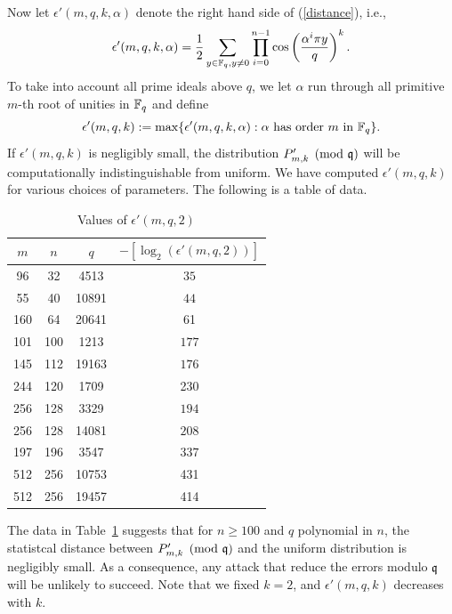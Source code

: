 \documentclass{amsart}
\begin{document}
Now let $\epsilon'(m,q,k,\alpha)$ denote the right hand side of (\ref{distance}), i.e.,
\[
    \epsilon'(m,q,k, \alpha) = \frac{1}{2}\sum_{y \in \mathbb{F}_q, y \neq 0} \prod_{i=0}^{n-1} \cos \left(\frac{ \alpha^i \pi y}{q} \right)^k.
\]
To take into account all prime ideals above $q$, we let $\alpha$ run through all primitive $m$-th root of unities in $\mathbb{F}_q$ and define
$$\epsilon'(m,q,k) := \max \{\epsilon'(m,q,k,\alpha): \alpha \mbox{ has order } m \mbox{ in } \mathbb{F}_q\}.$$
If $\epsilon'(m,q,k)$ is negligibly small, the distribution $P'_{m,k} \pmod {\mathfrak{q}}$ will be computationally indistinguishable from uniform. We have computed $\epsilon'(m,q,k)$ for various choices of parameters. The following is a table of data.


\begin{table}[H]
\label{tab: deg1}
\caption{Values of $\epsilon'(m,q,2)$}
\begin{tabular}{c|c|c|c}
$m$ & $n$ & $q$ & $-[\log_2(\epsilon'(m,q, 2))]$ \\
\hline
96 & 32 & 4513 & $35$ \\
55 & 40 & 10891  & $44$ \\
160 & 64 &20641 & 61 \\
101 & 100 & 1213 & $177$ \\
145 & 112  &19163 & $176$ \\
244 & 120 & 1709 & 230 \\
256 & 128 & 3329 & $194$ \\
256 & 128 & 14081 & $208$ \\
197 & 196 & 3547 & $337$ \\
512 & 256 &10753 & 431 \\
512 & 256 &19457 & 414
\end{tabular}
\end{table}

The data in Table~\ref{tab: deg1} suggests that for $n \geq 100$ and $q$ polynomial in $n$, the statistcal distance between $P'_{m,k} \pmod{\mathfrak{q}}$ and the uniform distribution is negligibly small. As a consequence, any attack that reduce the errors modulo $\mathfrak{q}$ will be unlikely to succeed. Note that we fixed $k= 2$, and $\epsilon'(m,q,k)$ decreases with $k$.
\end{document}
